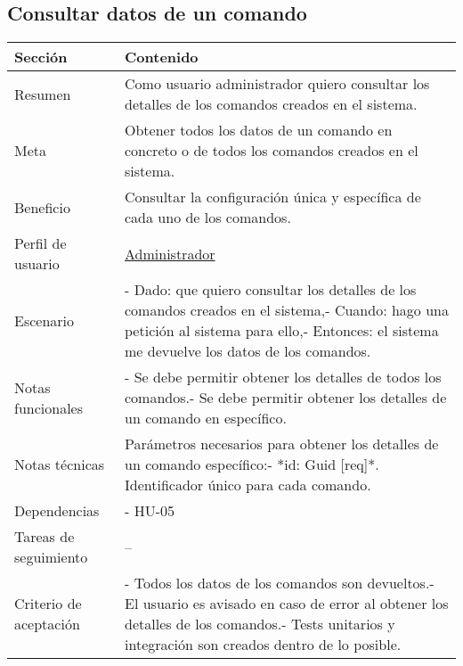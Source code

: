 \subsection{Consultar datos de un comando}

\begin{table}[H]
    \centering
    \begin{adjustbox}{max width=\textwidth}
    \begin{tabularx}{\textwidth}{|l|L|}
    \hline
        Sección & Contenido \\ \hline
        Resumen & Como usuario administrador quiero consultar los detalles de los comandos creados en el sistema. \\ \hline
        Meta & Obtener todos los datos de un comando en concreto o de todos los comandos creados en el sistema. \\ \hline
        Beneficio & Consultar la configuración única y específica de cada uno de los comandos. \\ \hline
        Perfil de usuario & \hyperref[sec:personaAdmin]{Administrador} \\ \hline
        Escenario & - Dado: que quiero consultar los detalles de los comandos creados en el sistema,\linebreak - Cuando: hago una petición al sistema para ello,\linebreak - Entonces: el sistema me devuelve los datos de los comandos. \\ \hline
        Notas funcionales & - Se debe permitir obtener los detalles de todos los comandos.\linebreak - Se debe permitir obtener los detalles de un comando en específico. \\ \hline
        Notas técnicas & Parámetros necesarios para obtener los detalles de un comando específico:\linebreak - *id: Guid [req]*. Identificador único para cada comando. \\ \hline
        Dependencias & - HU-05 \\ \hline
        Tareas de seguimiento & – \\ \hline
        Criterio de aceptación & - Todos los datos de los comandos son devueltos.\linebreak - El usuario es avisado en caso de error al obtener los detalles de los comandos.\linebreak - Tests unitarios y integración son creados dentro de lo posible. \\ \hline
    \end{tabularx}
    \end{adjustbox}
\end{table}

